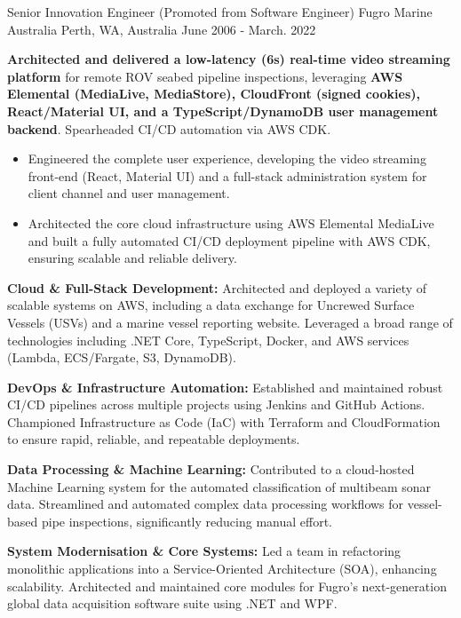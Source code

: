 \begin{cventries}
{    }
  \cventry
    {Senior Innovation Engineer (Promoted from Software Engineer)} %
    {Fugro Marine Australia} %
    {Perth, WA, Australia} %
    {June 2006 - March. 2022} %
    {
      \begin{cvitems} %
        \item {\textbf{Architected and delivered a low-latency (6s) real-time video streaming platform} for remote ROV seabed pipeline inspections, leveraging \textbf{AWS Elemental (MediaLive, MediaStore), CloudFront (signed cookies), React/Material UI, and a TypeScript/DynamoDB user management backend}. Spearheaded CI/CD automation via AWS CDK.}
          \begin{itemize}
            \item {Engineered the complete user experience, developing the video streaming front-end (React, Material UI) and a full-stack administration system for client channel and user management.}
            \item {Architected the core cloud infrastructure using AWS Elemental MediaLive and built a fully automated CI/CD deployment pipeline with AWS CDK, ensuring scalable and reliable delivery.}
          \end{itemize}
        \item {\textbf{Cloud \& Full-Stack Development:} Architected and deployed a variety of scalable systems on AWS, including a data exchange for Uncrewed Surface Vessels (USVs) and a marine vessel reporting website. Leveraged a broad range of technologies including .NET Core, TypeScript, Docker, and AWS services (Lambda, ECS/Fargate, S3, DynamoDB).}
        \item {\textbf{DevOps \& Infrastructure Automation:} Established and maintained robust CI/CD pipelines across multiple projects using Jenkins and GitHub Actions. Championed Infrastructure as Code (IaC) with Terraform and CloudFormation to ensure rapid, reliable, and repeatable deployments.}
        \item {\textbf{Data Processing \& Machine Learning:} Contributed to a cloud-hosted Machine Learning system for the automated classification of multibeam sonar data. Streamlined and automated complex data processing workflows for vessel-based pipe inspections, significantly reducing manual effort.}
        \item {\textbf{System Modernisation \& Core Systems:} Led a team in refactoring monolithic applications into a Service-Oriented Architecture (SOA), enhancing scalability. Architected and maintained core modules for Fugro's next-generation global data acquisition software suite using .NET and WPF.}

\end{cvitems}}
\end{cventries}
